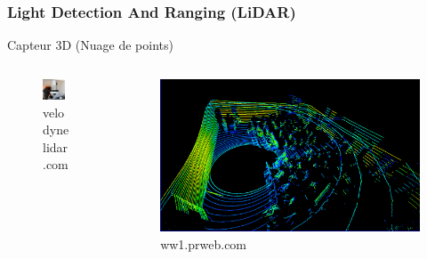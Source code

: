     \begin{frame}
        \frametitle{Light Detection And Ranging (LiDAR)}
        Capteur 3D (Nuage de points)
        \begin{columns}[c]                
            \begin{column}{0.5\textwidth}
                \begin{figure}                 
                    \includegraphics[width=0.8\textwidth]{./media/velodyne.jpg}
                    \caption{velodynelidar.com}
                \end{figure}                        
            \end{column} 
                            
            \begin{column}{0.5\textwidth}
                \begin{figure}                 
                    \includegraphics[width=\textwidth]{./media/velodyne_scan.png}
                    \caption{ww1.prweb.com}
                \end{figure}
            \end{column}            
        \end{columns}              
    \end{frame}
    
